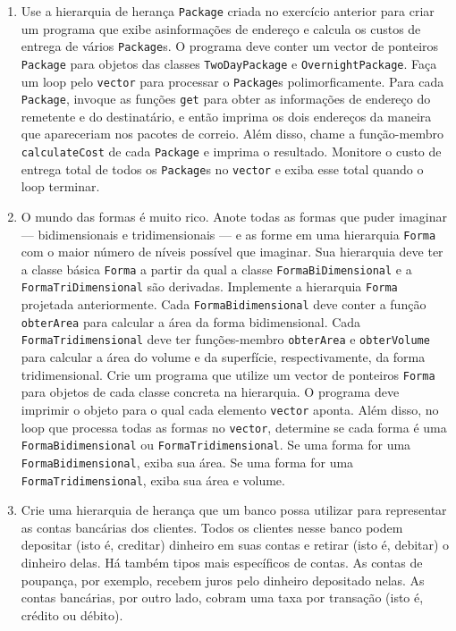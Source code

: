 \documentclass[fleqn]{article}
\begin{document}
\begin{enumerate}
  \item{
    Use a hierarquia de herança \texttt{Package} criada no exercício anterior para criar um programa que exibe asinformações de endereço e calcula os custos de entrega de vários \texttt{Package}s. O programa deve conter um vector de ponteiros \texttt{Package} para objetos das classes \texttt{TwoDayPackage} e \texttt{OvernightPackage}. Faça um loop pelo \texttt{vector} para processar o \texttt{Package}s polimorficamente. Para cada \texttt{Package}, invoque as funções \texttt{get} para obter as informações de endereço do remetente e do destinatário, e então imprima os dois endereços da maneira que apareceriam nos pacotes de correio. Além disso, chame a função-membro \texttt{calculateCost} de cada \texttt{Package} e imprima o resultado. Monitore o custo de entrega total de todos os \texttt{Package}s no \texttt{vector} e exiba esse total quando o loop terminar.
  }

  \item{
    O mundo das formas é muito rico. Anote todas as formas que puder imaginar — bidimensionais e tridimensionais — e as forme em uma hierarquia \texttt{Forma} com o maior número de níveis possível que imaginar. Sua hierarquia deve ter a classe básica \texttt{Forma} a partir da qual a classe \texttt{FormaBiDimensional} e a \texttt{FormaTriDimensional} são derivadas. Implemente a hierarquia \texttt{Forma} projetada anteriormente. Cada \texttt{FormaBidimensional} deve conter a função \texttt{obterArea} para calcular a área da forma bidimensional. Cada \texttt{FormaTridimensional} deve ter funções-membro \texttt{obterArea} e \texttt{obterVolume} para calcular a área do volume e da superfície, respectivamente, da forma tridimensional. Crie um programa que utilize um vector de ponteiros \texttt{Forma} para objetos de cada classe concreta na hierarquia. O programa deve imprimir o objeto para o qual cada elemento \texttt{vector} aponta. Além disso, no loop que processa todas as formas no \texttt{vector}, determine se cada forma é uma \texttt{FormaBidimensional} ou \texttt{FormaTridimensional}. Se uma forma for uma \texttt{FormaBidimensional}, exiba sua área. Se uma forma for uma \texttt{FormaTridimensional}, exiba sua área e volume.
  }

  \item{
    Crie uma hierarquia de herança que um banco possa utilizar para representar as contas bancárias dos clientes. Todos os clientes nesse banco podem depositar (isto é, creditar) dinheiro em suas contas e retirar (isto é, debitar) o dinheiro delas. Há também tipos mais específicos de contas. As contas de poupança, por exemplo, recebem juros pelo dinheiro depositado nelas. As contas bancárias, por outro lado, cobram uma taxa por transação (isto é, crédito ou débito).

}
\end{enumerate}
\end{document}
